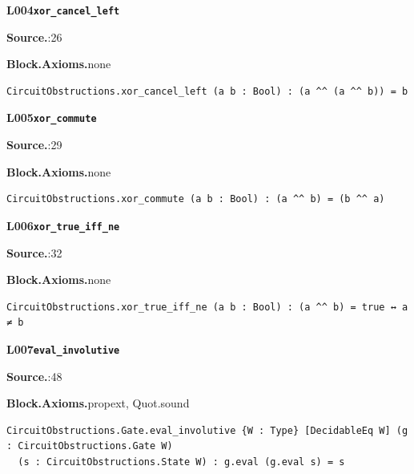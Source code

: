 \par\medskip\noindent\begin{minipage}{\textwidth}
{\small\bfseries L004\enspace\texttt{xor\_cancel\_left}\par}
{\footnotesize\raggedright\textbf{Source.}\enspace{}:26\par
\textbf{Block.}\quad\textbf{Axioms.}\enspace none\par}\nopagebreak
\begin{lstlisting}
CircuitObstructions.xor_cancel_left (a b : Bool) : (a ^^ (a ^^ b)) = b
\end{lstlisting}
\end{minipage}\par

\par\medskip\noindent\begin{minipage}{\textwidth}
{\small\bfseries L005\enspace\texttt{xor\_commute}\par}
{\footnotesize\raggedright\textbf{Source.}\enspace{}:29\par
\textbf{Block.}\quad\textbf{Axioms.}\enspace none\par}\nopagebreak
\begin{lstlisting}
CircuitObstructions.xor_commute (a b : Bool) : (a ^^ b) = (b ^^ a)
\end{lstlisting}
\end{minipage}\par

\par\medskip\noindent\begin{minipage}{\textwidth}
{\small\bfseries L006\enspace\texttt{xor\_true\_iff\_ne}\par}
{\footnotesize\raggedright\textbf{Source.}\enspace{}:32\par
\textbf{Block.}\quad\textbf{Axioms.}\enspace none\par}\nopagebreak
\begin{lstlisting}
CircuitObstructions.xor_true_iff_ne (a b : Bool) : (a ^^ b) = true ↔ a ≠ b
\end{lstlisting}
\end{minipage}\par

\par\medskip\noindent\begin{minipage}{\textwidth}
{\small\bfseries L007\enspace\texttt{eval\_involutive}\par}
{\footnotesize\raggedright\textbf{Source.}\enspace{}:48\par
\textbf{Block.}\quad\textbf{Axioms.}\enspace propext, Quot.sound\par}\nopagebreak
\begin{lstlisting}
CircuitObstructions.Gate.eval_involutive {W : Type} [DecidableEq W] (g : CircuitObstructions.Gate W)
  (s : CircuitObstructions.State W) : g.eval (g.eval s) = s
\end{lstlisting}
\end{minipage}\par

